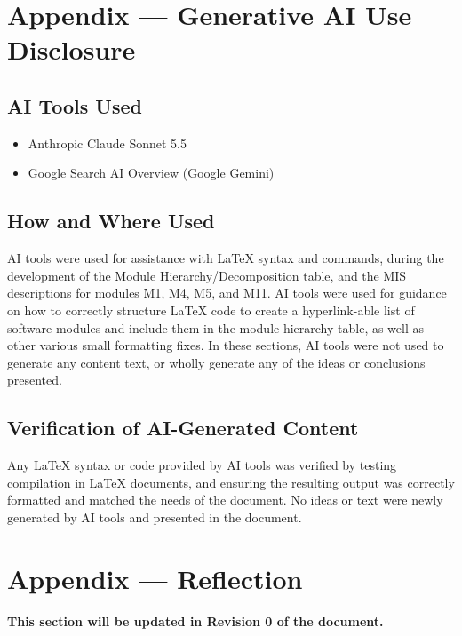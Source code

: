 \documentclass[12pt, titlepage]{article}
\begin{document}
\section{Appendix --- Generative AI Use Disclosure}

\subsection{AI Tools Used}

\begin{itemize}
	\item Anthropic Claude Sonnet 5.5
	\item Google Search AI Overview (Google Gemini)
\end{itemize}

\subsection{How and Where Used}

AI tools were used for assistance with LaTeX syntax and commands, during 
the development of the Module Hierarchy/Decomposition table, and the MIS 
descriptions for modules M1, M4, M5, and M11. AI tools were used for 
guidance on how to correctly 
structure LaTeX code to create a hyperlink-able list of software modules and 
include them in the module hierarchy table, as well as other various small 
formatting 
fixes. In these sections, 
AI tools were not used to generate any content text, or wholly generate any of 
the 
ideas or conclusions presented.

\subsection{Verification of AI-Generated Content}

Any LaTeX syntax or code provided by AI tools was verified by testing 
compilation in LaTeX documents, and ensuring the resulting output was 
correctly formatted and matched the needs of the document. No ideas or text 
were 
newly generated by AI tools and presented in the document.

\newpage{}

\section{Appendix --- Reflection}

\textbf{This section will be updated in Revision 0 of the document.}\\
\end{document}
